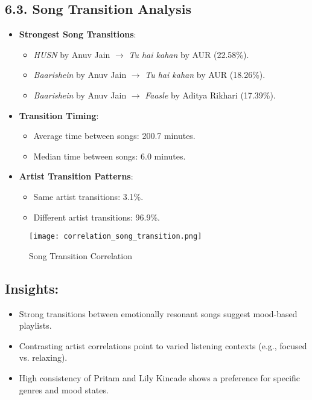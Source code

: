 \documentclass[12pt]{article}
\begin{document}
\begin{itemize}
\subsection*{6.3. Song Transition Analysis}
\begin{itemize}
    \item \textbf{Strongest Song Transitions}:
    \begin{itemize}
        \item \textit{HUSN} by Anuv Jain $\rightarrow$ \textit{Tu hai kahan} by AUR (22.58\%).
        \item \textit{Baarishein} by Anuv Jain $\rightarrow$ \textit{Tu hai kahan} by AUR (18.26\%).
        \item \textit{Baarishein} by Anuv Jain $\rightarrow$ \textit{Faasle} by Aditya Rikhari (17.39\%).
    \end{itemize}
    \item \textbf{Transition Timing}:
    \begin{itemize}
        \item Average time between songs: 200.7 minutes.
        \item Median time between songs: 6.0 minutes.
    \end{itemize}
    \item \textbf{Artist Transition Patterns}:
    \begin{itemize}
        \item Same artist transitions: 3.1\%.
        \item Different artist transitions: 96.9\%.
    \end{itemize}
\end{itemize}
\begin{figure}[H]
    \centering
    \texttt{[image: correlation\_song\_transition.png]}
    \caption{Song Transition Correlation}
    \label{fig:enter-label}
\end{figure}
\subsection*{Insights:}
\begin{itemize}
    \item Strong transitions between emotionally resonant songs suggest mood-based playlists.
    \item Contrasting artist correlations point to varied listening contexts (e.g., focused vs. relaxing).
    \item High consistency of Pritam and Lily Kincade shows a preference for specific genres and mood states.
\end{itemize}


\end{itemize}
\end{document}
